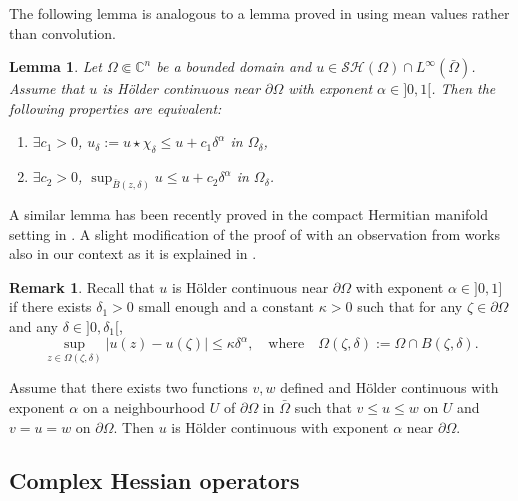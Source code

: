 \documentclass[JEP,XML,SOM,Unicode]{cedram}
\newenvironment{enumeratei}
{\bgroup\def\theenumi{\roman{enumi}}\def\theenumii{\arabic{enumii}}\begin{enumerate}}
{\end{enumerate}\egroup}
\newtheorem{lemma}[theorem]{Lemma}
\theoremstyle{definition}
\newtheorem{remark}[theorem]{Remark}
\renewcommand{\C}{\mathbb{C}}
\begin{document}
The following lemma is analogous to a lemma proved in \cite{GKZ08} using mean values rather than convolution.
\begin{lemma} \label{lem:sup-mean} Let $\Omega \Subset \C^n$ be a bounded domain and $u \in \mathcal{SH} (\Omega) \cap L^{\infty} ({\bar \Omega})$. Assume that $u$ is Hölder continuous near $\partial\Omega$ with exponent $\alpha \in{} ]0,1[$. Then the following properties are equivalent:
\begin{enumeratei}
\item
$\exists c_1 >0$, ${ u}_\delta:= u \star \chi_\delta \leq u + c_1 \delta^{\alpha}$ in $\Omega_\delta$,

\item
$\exists c_2 >0$, $\sup_{\bar B(z,\delta)} u \leq u + c_2 \delta^{\alpha}$ in $\Omega_\delta$.
\end{enumeratei}
\end{lemma}
A similar lemma has been recently proved in the compact Hermitian manifold setting in \cite{LPT20}.
A slight modification of the proof of \cite{GKZ08} with an observation from \cite{LPT20} works also in our context as it is explained in \cite{Ze20}.

\begin{remark} \label{rem:HolderBoundary} Recall that $u$ is Hölder continuous near $\partial\Omega$ with exponent $\alpha \in{}]0,1]$ if there exists $\delta_1 > 0$ small enough and a constant $\kappa > 0$ such that for any $\zeta \in \partial \Omega$ and any $\delta\in{}]0,\delta_1[$,
\[
\sup_{z \in \Omega (\zeta,\delta)} \vert u (z) - u (\zeta) \vert \leq \kappa \delta^\alpha, \quad\text{where}\quad \Omega(\zeta,\delta):= \Omega \cap B (\zeta,\delta).
\]

Assume that there exists two functions $v, w $ defined and Hölder continuous with exponent $\alpha $ on a neighbourhood $ U$ of $\partial \Omega$ in $\bar \Omega$ such that
$v \leq u \leq w$ on $ U$ and $v = u = w$ on $\partial \Omega$. Then $u$ is Hölder continuous with exponent $\alpha $ near $\partial \Omega$.
\end{remark}

\subsection{Complex Hessian operators}
\end{document}
